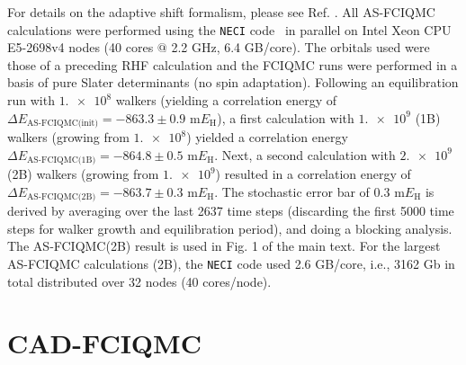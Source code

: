 \documentclass[journal=jcp,manuscript=suppinfo]{achemso}
\begin{document}
For details on the adaptive shift formalism, please see Ref. . All AS-FCIQMC calculations were performed using the {\texttt{NECI}} code~\cite{neci,neci_jcp_2020} in parallel on Intel Xeon CPU E5-2698v4 nodes (40 cores $@$ 2.2 GHz, 6.4 GB/core). The orbitals used were those of a preceding RHF calculation and the FCIQMC runs were performed in a basis of pure Slater determinants (no spin adaptation). Following an equilibration run with $\num{1.e8}$ walkers (yielding a correlation energy of $\Delta E_{\text{AS-FCIQMC(init)}} = -863.3\pm0.9$ m$E_{\text{H}}$), a first calculation with $\num{1.e9}$ (1B) walkers (growing from $\num{1.e8}$) yielded a correlation energy $\Delta E_{\text{AS-FCIQMC(1B)}} = -864.8\pm0.5$ m$E_{\text{H}}$. Next, a second calculation with $\num{2.e9}$ (2B) walkers (growing from $\num{1.e9}$) resulted in a correlation energy of $\Delta E_{\text{AS-FCIQMC(2B)}} = -863.7\pm0.3$ m$E_{\text{H}}$. The stochastic error bar of $0.3$ m$E_{\text{H}}$ is derived by averaging over the last 2637 time steps (discarding the first 5000 time steps for walker growth and equilibration period), and doing a blocking analysis. The AS‐FCIQMC(2B) result is used in Fig. 1 of the main text. For the largest AS-FCIQMC calculations (2B), the {\texttt{NECI}} code used 2.6 GB/core, i.e., 3162 Gb in total distributed over 32 nodes (40 cores/node).


\section{CAD-FCIQMC}
\label{cad_fciqmc_SI_sect}
\end{document}
